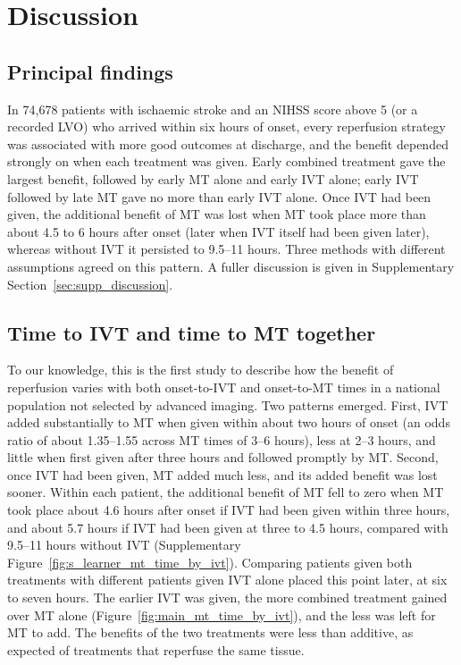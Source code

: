 
\section{Discussion}

\subsection{Principal findings}

In 74,678 patients with ischaemic stroke and an NIHSS score above 5 (or a recorded LVO) who arrived within six hours of onset, every reperfusion strategy was associated with more good outcomes at discharge, and the benefit depended strongly on when each treatment was given. Early combined treatment gave the largest benefit, followed by early MT alone and early IVT alone; early IVT followed by late MT gave no more than early IVT alone. Once IVT had been given, the additional benefit of MT was lost when MT took place more than about 4.5 to 6 hours after onset (later when IVT itself had been given later), whereas without IVT it persisted to 9.5--11 hours. Three methods with different assumptions agreed on this pattern. A fuller discussion is given in Supplementary Section~\ref{sec:supp_discussion}.

\subsection{Time to IVT and time to MT together}

To our knowledge, this is the first study to describe how the benefit of reperfusion varies with both onset-to-IVT and onset-to-MT times in a national population not selected by advanced imaging. Two patterns emerged. First, IVT added substantially to MT when given within about two hours of onset (an odds ratio of about 1.35--1.55 across MT times of 3--6 hours), less at 2--3 hours, and little when first given after three hours and followed promptly by MT. Second, once IVT had been given, MT added much less, and its added benefit was lost sooner. Within each patient, the additional benefit of MT fell to zero when MT took place about 4.6 hours after onset if IVT had been given within three hours, and about 5.7 hours if IVT had been given at three to 4.5 hours, compared with 9.5--11 hours without IVT (Supplementary Figure~\ref{fig:s_learner_mt_time_by_ivt}). Comparing patients given both treatments with different patients given IVT alone placed this point later, at six to seven hours. The earlier IVT was given, the more combined treatment gained over MT alone (Figure~\ref{fig:main_mt_time_by_ivt}), and the less was left for MT to add. The benefits of the two treatments were less than additive, as expected of treatments that reperfuse the same tissue.

